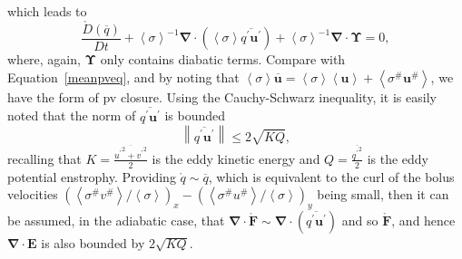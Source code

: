 \documentclass[12pt,a4paper]{report}
\newcommand*\thkmean[1]{\overline{#1}}
\newcommand*\thkres[1]{{#1}^{\prime}}
\newcommand*\nthkmean[1]{\left\langle{#1}\right\rangle}
\newcommand*\nthkres[1]{{#1}^{\#}}
\newcommand*\spec[1]{\mathring{#1}}
\newcommand*\equref[1]{Equation~\eqref{#1}}
\begin{document}
                      which leads  to
                      \begin{equation}
                      \frac{\spec{D} \left( \thkmean{q}\right)}{D t}
                      + \nthkmean{\sigma}^{-1}\boldsymbol{\nabla}\cdot\left(\nthkmean{\sigma}\thkmean{\thkres{q} \thkres{\boldsymbol{u}}}\right)
                      +\nthkmean{\sigma}^{-1}\boldsymbol{\nabla}\cdot\boldsymbol{\Upsilon}=0 ,
                      \end{equation}
                      where, again, $\boldsymbol{\Upsilon}$ only contains
                      diabatic terms. Compare with \equref{meanpveq}, and by noting that
                       ${\nthkmean{\sigma}\thkmean{\boldsymbol{u}}=\nthkmean{\sigma}\nthkmean{\boldsymbol{u}} + \nthkmean{\nthkres{\sigma}\nthkres{\boldsymbol{u}}}}$, we have the 
                       \cite{greatbatch1998exploring} form of \gls{pv} closure.
                       Using the Cauchy-Schwarz inequality, it is easily noted that
                       the norm of $\thkmean{\thkres{q} \thkres{\boldsymbol{u}}}$ is bounded
                       \begin{equation}
                       \left\|\thkmean{\thkres{q} \thkres{\boldsymbol{u}}}\right\|
                       \leq 2\sqrt{KQ},
                       \end{equation}
                       recalling that $K = \frac{\thkmean{{\thkres{u}}^{2} +
                       	{\thkres{v}}^{2}}}{2}$ is the eddy kinetic energy and $Q =
                        \frac{\thkmean{{\thkres{q}}^{2}}}{2}$ is the eddy potential enstrophy.
                       Providing $\spec{q} \sim \thkmean{q}$, which is equivalent 
                       to the  curl of the bolus velocities $\left(\nthkmean{\nthkres{\sigma}\nthkres{v}}/\nthkmean{\sigma}\right)_{x}-\left(\nthkmean{\nthkres{\sigma}\nthkres{u}}/\nthkmean{\sigma}\right)_{y}$ 
                       being small, then it can be assumed, in the adiabatic case,
                       that $\boldsymbol{\nabla}\cdot\spec{\boldsymbol{F}} \sim \boldsymbol{\nabla}\cdot\left(\thkmean{\thkres{q} \thkres{\boldsymbol{u}}}\right)$ and so $\spec{\boldsymbol{F}}$,
                       and hence $\boldsymbol{\nabla}\cdot\boldsymbol{E}$
                       is also bounded by  $2\sqrt{KQ}$.
                       
                       
                      
                      
                      
                      
                      
\end{document}
